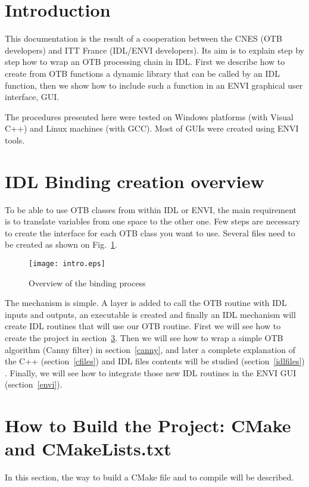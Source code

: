 
\section{Introduction}

This documentation is the result of a cooperation between the CNES
(OTB developers) and ITT France (IDL/ENVI developers). Its aim is to explain step by step how to wrap an OTB processing chain in IDL. First we describe how to create from OTB functions a dynamic library that can be called by an IDL function, then we show how to include such a function in an ENVI graphical user interface, GUI.

The procedures presented here were tested on Windows platforms (with Visual C++) and Linux machines (with GCC). Most of GUIs were created using ENVI tools.

\section{IDL Binding creation overview}

To be able to use OTB classes from within IDL or ENVI, the main requirement is to translate variables from one space to the other one. Few steps are necessary to create the interface for each OTB class you want to use. Several files need to be created as shown on Fig.~\ref{fig:overview}.

\begin{figure}[htp]
     \centering
      \texttt{[image: intro.eps]}
      \caption{Overview of the binding process}\label{fig:overview}
\end{figure}

The mechanism is simple. A layer is added to call the OTB routine with
IDL inputs and outputs, an executable is created and finally an IDL mechanism will create IDL routines that will use our OTB routine.
First we will see how to create the project in section~\ref{buildProject}. Then we will see how to wrap a simple OTB algorithm (Canny filter) in section~\ref{canny}, and later a complete explanation of
the C++ (section~\ref{cfiles}) and IDL files contents will be studied (section~\ref{idlfiles}) . Finally, we will see how to integrate those new IDL routines in the ENVI GUI (section~\ref{envi}).

\section{How to Build the Project: CMake and CMakeLists.txt}
\label{buildProject}
In this section, the way to build a CMake file and to compile will be
described.

